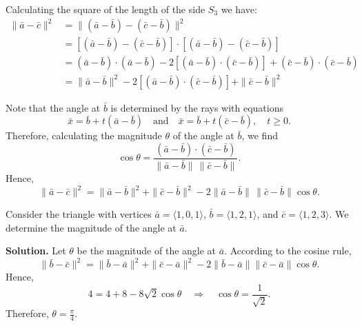 \begin{proofbox}
    Calculating the square of the length of the side \(S_3\) we have:
    \[
\begin{aligned}
\|\bar{a} - \bar{c}\|^2 
&= \|(\bar{a} - \bar{b}) - (\bar{c} - \bar{b})\|^2 \\
&= \left[(\bar{a} - \bar{b}) - (\bar{c} - \bar{b})\right] \cdot \left[(\bar{a} - \bar{b}) - (\bar{c} - \bar{b})\right] \\
&= (\bar{a} - \bar{b}) \cdot (\bar{a} - \bar{b}) 
   - 2\left[(\bar{a} - \bar{b}) \cdot (\bar{c} - \bar{b})\right] 
   + (\bar{c} - \bar{b}) \cdot (\bar{c} - \bar{b}) \\
&= \|\bar{a} - \bar{b}\|^2 
   - 2\left[(\bar{a} - \bar{b}) \cdot (\bar{c} - \bar{b})\right] 
   + \|\bar{c} - \bar{b}\|^2
\end{aligned}
\]

Note that the angle at \( \bar{b} \) is determined by the rays with equations
\[
\bar{x} = \bar{b} + t(\bar{a} - \bar{b}) \quad \text{and} \quad \bar{x} = \bar{b} + t(\bar{c} - \bar{b}), \quad t \geq 0.
\]
Therefore, calculating the magnitude \( \theta \) of the angle at \( \bar{b} \), we find
\[
\cos\theta = \frac{(\bar{a} - \bar{b}) \cdot (\bar{c} - \bar{b})}{\|\bar{a} - \bar{b}\| \, \|\bar{c} - \bar{b}\|}.
\]
Hence,
\[
\|\bar{a} - \bar{c}\|^2 = \|\bar{a} - \bar{b}\|^2 + \|\bar{c} - \bar{b}\|^2 - 2\|\bar{a} - \bar{b}\| \, \|\bar{c} - \bar{b}\| \cos\theta.
\]
\end{proofbox}
\begin{examplebox}
Consider the triangle with vertices $\bar{a} = \langle 1,0,1 \rangle$, $\bar{b} = \langle 1,2,1 \rangle$, and $\bar{c} = \langle 1,2,3 \rangle$. We determine the magnitude of the angle at $\bar{a}$.

\vspace{0.5em}
\textbf{Solution.} Let $\theta$ be the magnitude of the angle at $\bar{a}$. According to the cosine rule,
\[
\|\bar{b} - \bar{c}\|^2 = \|\bar{b} - \bar{a}\|^2 + \|\bar{c} - \bar{a}\|^2 - 2\|\bar{b} - \bar{a}\|\|\bar{c} - \bar{a}\|\cos\theta.
\]
Hence,
\[
4 = 4 + 8 - 8\sqrt{2}\cos\theta \quad \Rightarrow \quad \cos\theta = \frac{1}{\sqrt{2}}.
\]
Therefore, $\theta = \frac{\pi}{4}$.
\end{examplebox}

